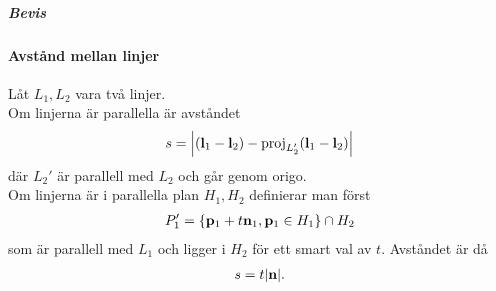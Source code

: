 \subparagraph{Bevis}

\paragraph{Avstånd mellan linjer}
Låt $L_1, L_2$ vara två linjer. \\
Om linjerna är parallella är avståndet
\begin{align*}
	s = \abs{(\vect{l}_1 - \vect{l}_2) - \proj{L_2'}{\vect{l}_1 - \vect{l}_2}}
\end{align*}
där $L_2'$ är parallell med $L_2$ och går genom origo. \\
Om linjerna är i parallella plan $H_1, H_2$ definierar man först
\begin{align*}
	P_1' = \{\vect{p}_1 + t\vect{n}_1, \vect{p}_1\in H_1\}\cap H_2
\end{align*}
som är parallell med $L_1$ och ligger i $H_2$ för ett smart val av $t$. Avståndet är då
\begin{align*}
	s = t\abs{\vect{n}}.
\end{align*}